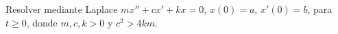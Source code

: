 Resolver mediante Laplace \(mx''+cx'+kx=0\), \(x(0)=a\), \(x'(0)=b\), para \(t\ge0\), donde \(m,c,k>0\) y \(c^2>4km\).
